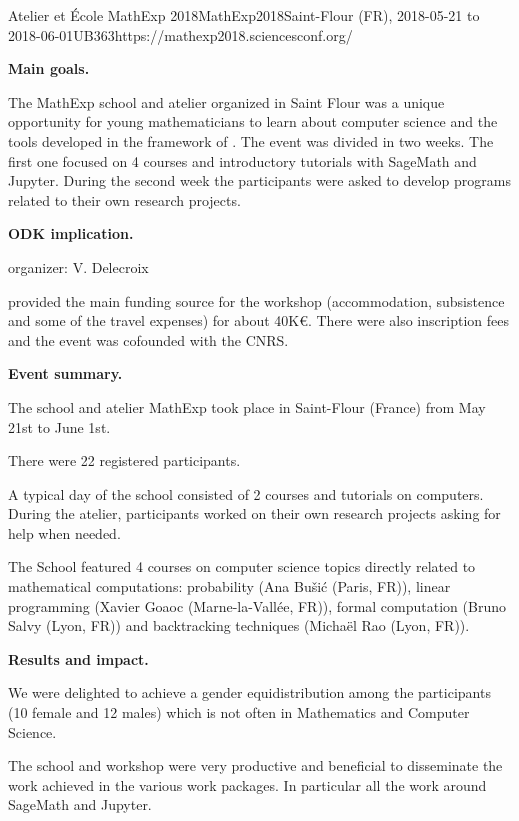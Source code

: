 \begin{event}{Atelier et \'Ecole MathExp 2018}{MathExp2018}{Saint-Flour (FR),
2018-05-21 to 2018-06-01}{UB}{36}{3}{https://mathexp2018.sciencesconf.org/}

\textbf{Main goals.}

The MathExp school and atelier organized in Saint Flour was a unique
opportunity for young mathematicians to learn about computer science
and the tools developed in the framework of \ODK. The event
was divided in two weeks. The first one focused on 4 courses and
introductory tutorials with SageMath and Jupyter. During the second
week the participants were asked to develop programs related to their
own research projects.

\textbf{ODK implication.} 

\ODK organizer: V. Delecroix

\ODK provided the main funding source for the workshop (accommodation,
subsistence and some of the travel expenses) for about 40K\euro. There were
also inscription fees and the event was cofounded with the CNRS.

\textbf{Event summary.} 

The school and atelier MathExp took place in Saint-Flour (France)
from May 21st to June 1st.

There were 22 registered participants.

A typical day of the school consisted of 2 courses and tutorials
on computers. During the atelier, participants worked on their
own research projects asking for help when needed.

The School featured 4 courses on computer science topics directly
related to mathematical computations: probability (Ana Bušić (Paris, FR)),
linear programming (Xavier Goaoc (Marne-la-Vallée, FR)), formal computation
(Bruno Salvy (Lyon, FR)) and backtracking techniques (Michaël Rao (Lyon, FR)).

\textbf{Results and impact.} 

We were delighted to achieve a gender equidistribution among the participants
(10 female and 12 males) which is not often in Mathematics and Computer
Science.

The school and workshop were very productive and beneficial to disseminate
the work achieved in the various work packages. In particular
all the work around SageMath and Jupyter.

\end{event}
